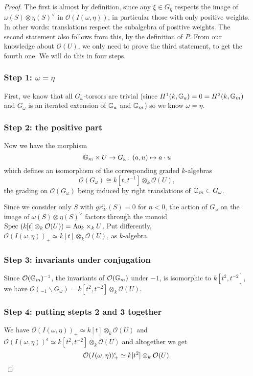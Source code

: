\begin{proof}
The first is almost by definition, since any $\xi \in G_\eta$ respects the image of $\omega(S) \otimes \eta(S)^\vee$ in $\mathcal{O}(I(\omega,\eta))$, in particular those with only positive weights. In other words: translations respect the subalgebra of positive weights. The second statement also follows from this, by the definition of $P$.
From our knowledge about $\mathcal{O}(U)$, we only need to prove the third statement, to get the fourth one.
We will do this in four steps.

\subsubsection{Step 1: $\omega = \eta$}
 First, we know that all $G_\omega$-torsors are trivial (since $H^1(k,\mathbb{G}_a)=0=H^2(k,\mathbb{G}_m)$ and $G_\omega$ is an iterated extension of $\mathbb{G}_a$ and $\mathbb{G}_m$) so we know $\omega = \eta$.

\subsubsection{Step 2: the positive part}
Now we have the morphism
\[\mathbb{G}_m \times U \to G_\omega,\ (a,u) \mapsto a\cdot u\]
which defines an isomorphism of the corresponding graded $k$-algebras
\[\mathcal{O}(G_\omega) \cong k[t,t^{-1}] \otimes_k \mathcal{O}(U),\]
the grading on $\mathcal{O}(G_\omega)$ being induced by right translations of $\mathbb{G}_m \subset G_\omega$.

Since we consider only $S$ with $gr_W^n(S) = 0$ for $n < 0$, the action of $G_\omega$ on the image of $\omega(S) \otimes \eta(S)^\vee$ factors through the monoid $\mathrm{Spec}~( k[t] \otimes_k \mathcal{O}(U)) = \mathrm{Ao}_k \times_k U$.
Put differently, $\mathcal{O}(I(\omega,\eta))_+ \simeq k[t] \otimes_k \mathcal{O}(U)$, as $k$-algebra.

\subsubsection{Step 3: invariants under conjugation}
Since $\mathcal{O}(\mathbb{G}_m)^{-1}$, the invariants of $\mathcal{O}(\mathbb{G}_m)$ under $-1$, is isomorphic to $k[t^2,t^{-2}]$, we have
$\mathcal{O}({}_{-1}\backslash G_\omega) = k[t^2,t^{-2}] \otimes_k \mathcal{O}(U)$.

\subsubsection{Step 4: putting stepts 2 and 3 together}
We have $\mathcal{O}(I(\omega,\eta))_+ \simeq k[t] \otimes_k \mathcal{O}(U)$ and $\mathcal{O}(I(\omega,\eta))^\epsilon \simeq k[t^2,t^{-2}] \otimes_k \mathcal{O}(U)$ and altogether we get
\[\mathcal{O}(I(\omega,\eta))_+^{\epsilon} \simeq k[t^2] \otimes_k \mathcal{O}(U). \qedhere\]
\end{proof}
